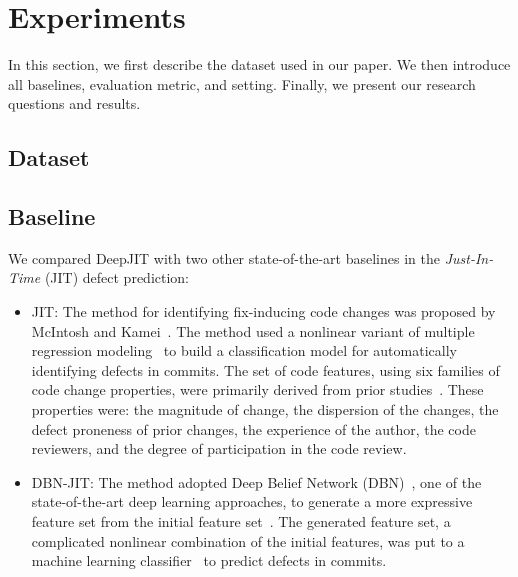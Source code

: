 \section{Experiments}
\label{sec:exp}
In this section, we first describe the dataset used in our paper. We then introduce all baselines, evaluation metric, and setting. Finally, we present our research questions and results.

\subsection{Dataset}
\label{sec:dataset}

\subsection{Baseline}
\label{sec:baseline}
We compared DeepJIT with two other state-of-the-art baselines in the \emph{Just-In-Time} (JIT) defect prediction:
\begin{itemize}
\item JIT: The method for identifying fix-inducing code changes was proposed by McIntosh and Kamei~\cite{mcintosh2018fix}. The method used a nonlinear variant of multiple regression modeling~\cite{fox1997applied} to build a classification model for automatically identifying defects in commits. The set of code features, using six families of code change properties, were primarily derived from prior studies~\cite{Kamei:2013:LES, Kim:2008:CSC, Kononenko:2015, Mockus2000}. These properties were: the magnitude of change, the dispersion of the changes, the defect proneness of prior changes, the experience of the author, the code reviewers, and the degree of participation in the code review. 
\item DBN-JIT: The method adopted Deep Belief Network (DBN)~\cite{hinton2006reducing}, one of the state-of-the-art deep learning approaches, to generate a more expressive feature set from the initial feature set~\cite{Yang:2015:DLJ}. The generated feature set, a complicated nonlinear combination of the initial features, was put to a machine learning classifier~\cite{nasrabadi2007pattern} to predict defects in commits. 
\end{itemize}

